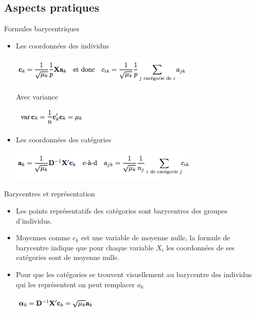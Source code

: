 \documentclass[11pt]{beamer}
\begin{document}
\subsection{Aspects pratiques}

\begin{frame}{Formules barycentriques}
 
 \begin{itemize}
 \centering
 \item  Les coordonnées des individus 
 
  \includegraphics[scale=0.7]{AFC5} 
  
  Avec variance 
  
  \includegraphics[scale=0.7]{AFC6} 
 

 \item  Les coordonnées des catégories
 
 \includegraphics[scale=0.7]{AFC7} 
 
 \end{itemize}
 
 
\end{frame}


 





\begin{frame}{ Barycentres et représentation }
 
 \begin{itemize}
 
 \item  Les points représentatifs des catégories sont barycentres des groupes d'individus.
 
 \item Moyennes comme $c_k$ est une variable de moyenne nulle, la formule de barycentre indique que pour chaque variable $X_i$
les coordonnées de ses catégories  sont de moyenne nulle. 
 
 \item  Pour que les catégories se trouvent visuellement
au barycentre des individus qui les représentent on peut
remplacer $a_k$ 

\centering

 \includegraphics[scale=0.7]{AFC8} 
 
 \end{itemize}
 
 
\end{frame}
\end{document}
